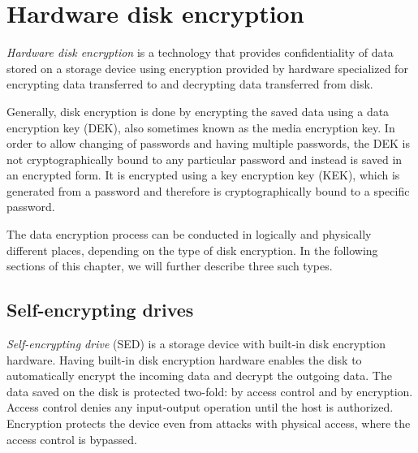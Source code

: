 
\chapter{Hardware disk encryption}

\emph{Hardware disk encryption} is a technology that provides confidentiality of data stored on a storage device using encryption provided by hardware specialized for encrypting data transferred to and decrypting data transferred from disk.



Generally, disk encryption is done by encrypting the saved data using a data encryption key (DEK), also sometimes known as the media encryption key. In order to allow changing of passwords and having multiple passwords, the DEK is not cryptographically bound to any particular password and instead is saved in an encrypted form. It is encrypted using a key encryption key (KEK), which is generated from a password and therefore is cryptographically bound to a specific password.



The data encryption process can be conducted in logically and physically different places, depending on the type of disk encryption. In the following sections of this chapter, we will further describe three such types.

\section{Self-encrypting drives}

\emph{Self-encrypting drive} (SED) is a storage device with built-in disk encryption hardware. Having built-in disk encryption hardware enables the disk to automatically encrypt the incoming data and decrypt the outgoing data. 
The data saved on the disk is protected two-fold: by access control and by encryption.
Access control denies any input-output operation until the host is authorized.
Encryption protects the device even from attacks with physical access, where the access control is bypassed.

